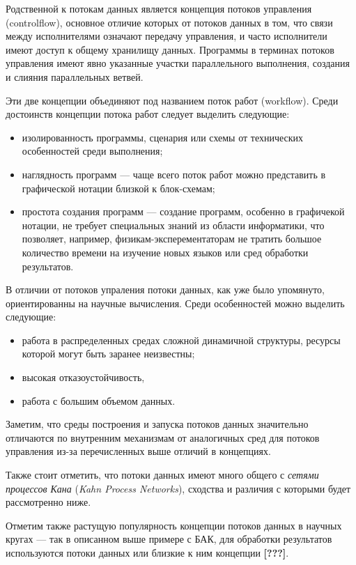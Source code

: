 \documentclass[10pt,a4paper]{article}
\begin{document}
Родственной к потокам данных является концепция потоков управления (controlflow), основное отличие которых от потоков данных в том, что связи между исполнителями
означают передачу управления, и часто исполнители имеют доступ к общему хранилищу данных. Программы в терминах потоков управления имеют явно указанные
участки параллельного выполнения, создания и слияния параллельных ветвей.

Эти две концепции объединяют под названием поток работ (workflow).
Среди достоинств концепции потока работ следует выделить следующие:
\begin{itemize}
  \item изолированность программы, сценария или схемы от технических особенностей среди выполнения;
  \item наглядность программ --- чаще всего поток работ можно представить в графической нотации близкой к блок-схемам;
  \item простота создания программ --- создание программ, особенно в графичекой нотации, не требует специальных знаний из области информатики,
        что позволяет, например, физикам-эксперементаторам не тратить большое количество времени на изучение новых языков или сред обработки результатов.
\end{itemize}

В отличии от потоков упраления потоки данных, как уже было упомянуто, ориентированны на научные вычисления.
Среди особенностей можно выделить следующие:
\begin{itemize}
  \item работа в распределенных средах сложной динамичной структуры, ресурсы которой могут быть заранее неизвестны;
  \item высокая отказоустойчивость,
  \item работа с большим объемом данных.
\end{itemize}
Заметим, что среды построения и запуска потоков данных значительно отличаются по внутренним механизмам от
аналогичных сред для потоков управления из-за перечисленных выше отличий в концепциях.

Также стоит отметить, что потоки данных имеют
много общего с \textit{сетями процессов Кана} (\textit{Kahn Process Networks}), сходства и различия с которыми будет рассмотренно ниже.

Отметим также растущую популярность концепции потоков данных в научных кругах --- так в описанном выше примере с БАК,
для обработки результатов используются потоки данных или близкие к ним концепции \textbf{[???]}.
\end{document}
